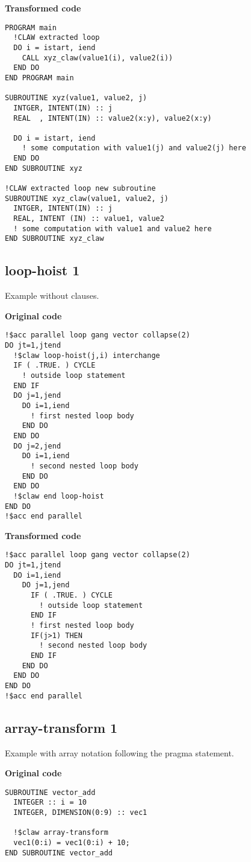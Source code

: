 \documentclass{article}
\begin{document}
\textbf{Transformed code}
\begin{lstlisting}
PROGRAM main
  !CLAW extracted loop
  DO i = istart, iend
    CALL xyz_claw(value1(i), value2(i))
  END DO
END PROGRAM main

SUBROUTINE xyz(value1, value2, j)
  INTGER, INTENT(IN) :: j
  REAL  , INTENT(IN) :: value2(x:y), value2(x:y)

  DO i = istart, iend
    ! some computation with value1(j) and value2(j) here
  END DO
END SUBROUTINE xyz

!CLAW extracted loop new subroutine
SUBROUTINE xyz_claw(value1, value2, j)
  INTGER, INTENT(IN) :: j
  REAL, INTENT (IN) :: value1, value2
  ! some computation with value1 and value2 here
END SUBROUTINE xyz_claw
\end{lstlisting}

\subsection{loop-hoist 1}
\label{loop-hoist1}
Example without clauses. 

\textbf{Original code}
\begin{lstlisting}
!$acc parallel loop gang vector collapse(2)
DO jt=1,jtend
  !$claw loop-hoist(j,i) interchange
  IF ( .TRUE. ) CYCLE
    ! outside loop statement
  END IF
  DO j=1,jend
    DO i=1,iend
      ! first nested loop body
    END DO
  END DO
  DO j=2,jend
    DO i=1,iend
      ! second nested loop body
    END DO
  END DO
  !$claw end loop-hoist
END DO
!$acc end parallel
\end{lstlisting}


\textbf{Transformed code}
\begin{lstlisting}
!$acc parallel loop gang vector collapse(2)
DO jt=1,jtend
  DO i=1,iend
    DO j=1,jend
      IF ( .TRUE. ) CYCLE
        ! outside loop statement
      END IF
      ! first nested loop body
      IF(j>1) THEN
        ! second nested loop body
      END IF
    END DO
  END DO
END DO
!$acc end parallel
\end{lstlisting}


\subsection{array-transform 1}
\label{array-transform1}
Example with array notation following the pragma statement. 

\textbf{Original code}
\begin{lstlisting}
SUBROUTINE vector_add
  INTEGER :: i = 10
  INTEGER, DIMENSION(0:9) :: vec1

  !$claw array-transform
  vec1(0:i) = vec1(0:i) + 10;
END SUBROUTINE vector_add
\end{lstlisting}
\end{document}
